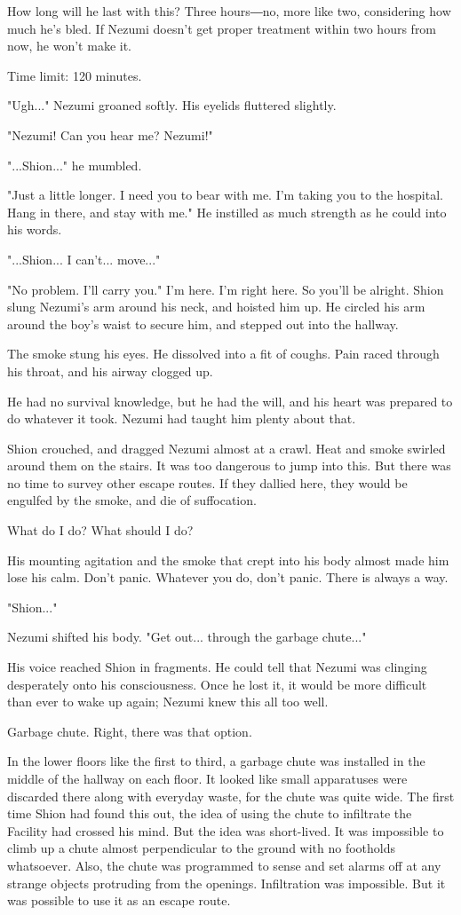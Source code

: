 How long will he last with this? Three hours―no, more like two,
considering how much he's bled. If Nezumi doesn't get proper treatment
within two hours from now, he won't make it.

Time limit: 120 minutes.

"Ugh..." Nezumi groaned softly. His eyelids fluttered slightly.

"Nezumi! Can you hear me? Nezumi!"

"...Shion..." he mumbled.

"Just a little longer. I need you to bear with me. I'm taking you to the
hospital. Hang in there, and stay with me." He instilled as much
strength as he could into his words.

"...Shion... I can't... move..."

"No problem. I'll carry you." I'm here. I'm right here. So you'll be
alright. Shion slung Nezumi's arm around his neck, and hoisted him up.
He circled his arm around the boy's waist to secure him, and stepped out
into the hallway.

The smoke stung his eyes. He dissolved into a fit of coughs. Pain raced
through his throat, and his airway clogged up.

He had no survival knowledge, but he had the will, and his heart was
prepared to do whatever it took. Nezumi had taught him plenty about
that.

Shion crouched, and dragged Nezumi almost at a crawl. Heat and smoke
swirled around them on the stairs. It was too dangerous to jump into
this. But there was no time to survey other escape routes. If they
dallied here, they would be engulfed by the smoke, and die of
suffocation.

What do I do? What should I do?

His mounting agitation and the smoke that crept into his body almost
made him lose his calm. Don't panic. Whatever you do, don't panic. There
is always a way.

"Shion..."

Nezumi shifted his body. "Get out... through the garbage chute..."

His voice reached Shion in fragments. He could tell that Nezumi was
clinging desperately onto his consciousness. Once he lost it, it would
be more difficult than ever to wake up again; Nezumi knew this all too
well.

Garbage chute. Right, there was that option.

In the lower floors like the first to third, a garbage chute was
installed in the middle of the hallway on each floor. It looked like
small apparatuses were discarded there along with everyday waste, for
the chute was quite wide. The first time Shion had found this out, the
idea of using the chute to infiltrate the Facility had crossed his mind.
But the idea was short-lived. It was impossible to climb up a chute
almost perpendicular to the ground with no footholds whatsoever. Also,
the chute was programmed to sense and set alarms off at any strange
objects protruding from the openings. Infiltration was impossible. But
it was possible to use it as an escape route.

